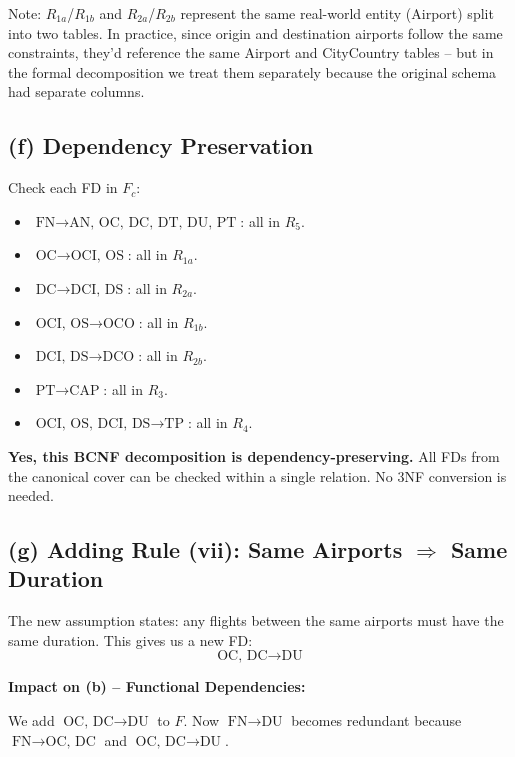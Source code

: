 \documentclass[11pt]{article}
\begin{document}
\medskip
Note: $R_{1a}$/$R_{1b}$ and $R_{2a}$/$R_{2b}$ represent the same real-world entity (Airport) split into two tables. In practice, since origin and destination airports follow the same constraints, they'd reference the same Airport and CityCountry tables -- but in the formal decomposition we treat them separately because the original schema had separate columns.

\subsection{(f) Dependency Preservation}

Check each FD in $F_c$:
\begin{itemize}
  \item $\text{FN} \to \text{AN, OC, DC, DT, DU, PT}$: all in $R_5$. \checkmark
  \item $\text{OC} \to \text{OCI, OS}$: all in $R_{1a}$. \checkmark
  \item $\text{DC} \to \text{DCI, DS}$: all in $R_{2a}$. \checkmark
  \item $\text{OCI, OS} \to \text{OCO}$: all in $R_{1b}$. \checkmark
  \item $\text{DCI, DS} \to \text{DCO}$: all in $R_{2b}$. \checkmark
  \item $\text{PT} \to \text{CAP}$: all in $R_3$. \checkmark
  \item $\text{OCI, OS, DCI, DS} \to \text{TP}$: all in $R_4$. \checkmark
\end{itemize}

\textbf{Yes, this BCNF decomposition is dependency-preserving.} All FDs from the canonical cover can be checked within a single relation. No 3NF conversion is needed.

\subsection{(g) Adding Rule (vii): Same Airports $\Rightarrow$ Same Duration}

The new assumption states: any flights between the same airports must have the same duration. This gives us a new FD:
\[
\text{OC, DC} \to \text{DU}
\]

\noindent\textbf{Impact on (b) -- Functional Dependencies:}

We add $\text{OC, DC} \to \text{DU}$ to $F$. Now $\text{FN} \to \text{DU}$ becomes redundant because $\text{FN} \to \text{OC, DC}$ and $\text{OC, DC} \to \text{DU}$.
\end{document}
